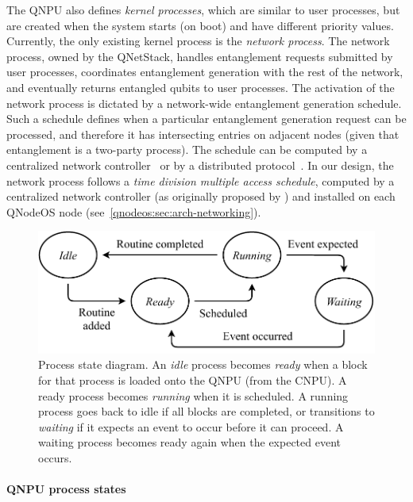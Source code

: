 The \ac{QNPU} also defines \emph{kernel processes}, which are similar to user processes, but are created when the system starts (on boot) and have different priority values. Currently, the only existing kernel process is the \emph{network process}. The network process, owned by the \ac{QNetStack}, handles entanglement requests submitted by user processes, coordinates entanglement generation with the rest of the network, and eventually returns entangled qubits to user processes. The activation of the network process is dictated by a network-wide entanglement generation schedule. Such a schedule defines when a particular entanglement generation request can be processed, and therefore it has intersecting entries on adjacent nodes (given that entanglement is a two-party process). The schedule can be computed by a centralized network controller~\cite{skrzypczyk_2021_arch} or by a distributed protocol~\cite{dahlberg_2019_egp}. In our design, the network process follows a \emph{time division multiple access schedule}, computed by a centralized network controller (as originally proposed by \textcite{skrzypczyk_2021_arch}) and installed on each \ac{QNodeOS} node (see~\cref{qnodeos:sec:arch-networking}).

\begin{figure}
\begin{center}
\includegraphics[width=\linewidth]{figures/qnodeos/supplementary/process-states.pdf}
\end{center}
\caption[]{Process state diagram. An \emph{idle} process becomes \emph{ready} when a block for that process is loaded onto the \ac{QNPU} (from the \ac{CNPU}). A ready process becomes \emph{running} when it is scheduled. A running process goes back to idle if all blocks are completed, or transitions to \emph{waiting} if it expects an event to occur before it can proceed. A waiting process becomes ready again when the expected event occurs.}
\label{fig:process-states}
\end{figure}

\paragraph{QNPU process states}

